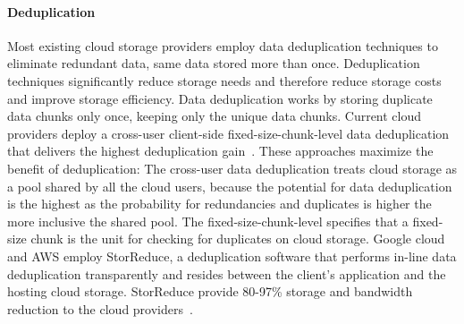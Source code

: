 \paragraph{Deduplication} Most existing cloud storage providers employ data
deduplication techniques to eliminate redundant data, same data stored more
than once.
%
Deduplication techniques significantly reduce storage needs and therefore
reduce storage costs and improve storage efficiency.
%
Data deduplication works by storing duplicate data chunks only once, keeping
only the unique data chunks. 
%
Current cloud providers deploy a cross-user client-side fixed-size-chunk-level
data deduplication that delivers the highest deduplication
gain~\cite{pooranian2018rare}.
%
These approaches maximize the benefit of deduplication: The cross-user data
deduplication treats cloud storage as a pool shared by all the cloud users,
because the potential for data deduplication is the highest as the probability
for redundancies and duplicates is higher the more inclusive the shared pool.
%
The fixed-size-chunk-level specifies that a fixed-size chunk is the unit for
checking for duplicates on cloud storage.
%
Google cloud and AWS employ StorReduce, a deduplication software that performs
in-line data deduplication transparently and resides between the client's
application and the hosting cloud storage.
%
StorReduce provide 80-97\% storage and bandwidth reduction to the cloud
providers~\cite{StorReduce_google}.
